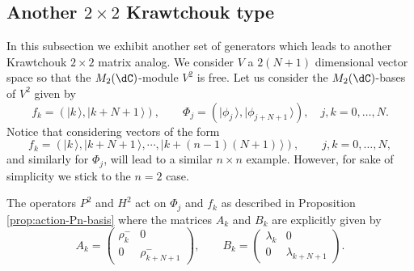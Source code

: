 \documentclass[a4paper,reqno]{amsart}
\theoremstyle{definition}
\numberwithin{equation}{section}
\newcommand{\ket}[1]{\mid{#1}\,\rangle}
\begin{document}

\subsection{Another $2\times 2$ Krawtchouk type }

In this subsection we exhibit another set of generators which leads to another Krawtchouk $2\times 2$ matrix analog. We consider $V$ a $2(N+1)$ dimensional vector space so that the $M_2(\dC)$-module $V^2$ is free. Let us consider the $M_2(\dC)$-bases of $V^2$ given by
\begin{equation}
    f_k=(\ket{k},\ket{k+N+1}), \qquad \Phi_j=(\ket{\phi_{j}}, \ket{\phi_{j+N+1}}),\quad j,k=0,\ldots,N.
\end{equation}
Notice that considering vectors of the form
\begin{equation}
        f_k=(\ket{k},\ket{k+N+1},\cdots, \ket{k+(n-1)(N+1)}),\qquad j,k=0,\ldots,N,
\end{equation}
and similarly for $\Phi_j$, will lead to a similar $n\times n $ example. However, for sake of simplicity we stick to the $n=2$ case.


The operators $P^2$ and $H^2$ act on $\Phi_j$ and $f_k$ as described in Proposition \ref{prop:action-Pn-basis}
where the matrices $A_k$ and $B_k$ are explicitly given by
\begin{equation}
A_k=\begin{pmatrix}
\rho^-_{k}&0\\0&\rho^-_{k+N+1}\end{pmatrix}, \qquad B_k=\begin{pmatrix}
\lambda_{k}&0\\0&\lambda_{k+N+1} \end{pmatrix}.    
\end{equation}
\end{document}
